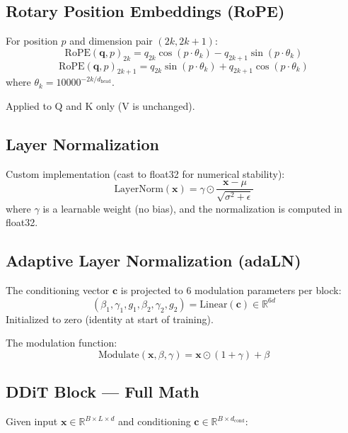 \documentclass[11pt,a4paper]{article}
\begin{document}
\subsection{Rotary Position Embeddings (RoPE)}

For position $p$ and dimension pair $(2k, 2k{+}1)$:
\[
\text{RoPE}(\mathbf{q}, p)_{2k} = q_{2k} \cos(p \cdot \theta_k) - q_{2k+1} \sin(p \cdot \theta_k)
\]
\[
\text{RoPE}(\mathbf{q}, p)_{2k+1} = q_{2k} \sin(p \cdot \theta_k) + q_{2k+1} \cos(p \cdot \theta_k)
\]
where $\theta_k = 10000^{-2k/d_{\text{head}}}$.

Applied to Q and K only (V is unchanged).

\subsection{Layer Normalization}

Custom implementation (cast to float32 for numerical stability):
\[
\text{LayerNorm}(\mathbf{x}) = \gamma \odot \frac{\mathbf{x} - \mu}{\sqrt{\sigma^2 + \epsilon}}
\]
where $\gamma$ is a learnable weight (no bias), and the normalization is computed in float32.

\subsection{Adaptive Layer Normalization (adaLN)}

The conditioning vector $\mathbf{c}$ is projected to 6 modulation parameters per block:
\[
(\beta_1, \gamma_1, g_1, \beta_2, \gamma_2, g_2) = \text{Linear}(\mathbf{c}) \in \mathbb{R}^{6d}
\]
Initialized to zero (identity at start of training).

The modulation function:
\[
\text{Modulate}(\mathbf{x}, \beta, \gamma) = \mathbf{x} \odot (1 + \gamma) + \beta
\]

\subsection{DDiT Block --- Full Math}

Given input $\mathbf{x} \in \mathbb{R}^{B \times L \times d}$ and conditioning $\mathbf{c} \in \mathbb{R}^{B \times d_\text{cond}}$:
\end{document}
